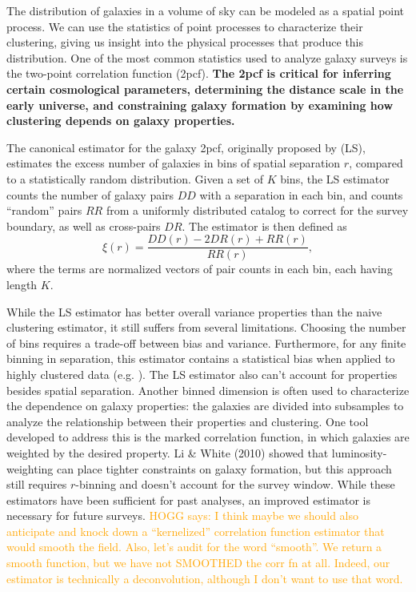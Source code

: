 \documentclass[12pt, fullpage, letterpaper]{article}
\newcommand{\HOGG}[1]{\textcolor{orange}{HOGG says: #1}}
\newcommand{\cf}{2pcf\xspace}
\newcommand{\LS}{LS\xspace}
\begin{document}
The distribution of galaxies in a volume of sky can be modeled as a spatial point process.
We can use the statistics of point processes to characterize their clustering, giving us insight into the physical processes that produce this distribution.
One of the most common statistics used to analyze galaxy surveys is the two-point correlation function (\cf). 
\textbf{The \cf is critical for inferring certain cosmological parameters, determining the distance scale in the early universe, and constraining galaxy formation by examining how clustering depends on galaxy properties.}
 
The canonical estimator for the galaxy \cf, originally proposed by \cite{LandySzalay1993} (\LS), estimates the excess number of galaxies in bins of spatial separation $r$, compared to a statistically random distribution.
Given a set of $K$ bins, the \LS estimator counts the number of galaxy pairs $DD$ with a separation in each bin, and counts ``random'' pairs $RR$ from a uniformly distributed catalog  to correct for the survey boundary, as well as cross-pairs $DR$.
The estimator is then defined as
\begin{equation}
\xi(r) = \frac{DD(r) - 2DR(r) + RR(r)}{RR(r)},
\end{equation}
where the terms are normalized vectors of pair counts in each bin, each having length $K$.

While the \LS estimator has better overall variance properties than the naive clustering estimator, it still suffers from several limitations. 
Choosing the number of bins requires a trade-off between bias and variance.
Furthermore, for any finite binning in separation, this estimator contains a statistical bias when applied to highly clustered data (e.g. \citealt{Kerscher1998}).
The \LS estimator also can't account for properties besides spatial separation.
Another binned dimension is often used to characterize the dependence
on galaxy properties: the galaxies are divided into subsamples to
analyze the relationship between their properties and clustering.
One tool developed to address this is the marked correlation function, in which galaxies are weighted by the desired property.
Li \& White (2010) showed that luminosity-weighting can place tighter constraints on galaxy formation, but this approach still requires $r$-binning and doesn't account for the survey window.
While these estimators have been sufficient for past analyses, an improved estimator is necessary for future surveys.
\HOGG{I think maybe we should also anticipate and knock down a
  ``kernelized'' correlation function estimator that would smooth the
  field. Also, let's audit for the word ``smooth''. We return a smooth
  function, but we have not SMOOTHED the corr fn at all. Indeed, our
  estimator is technically a deconvolution, although I don't want to
  use that word.}
\end{document}
